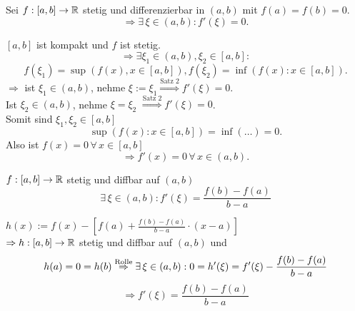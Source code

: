 \documentclass[../ana1.tex]{subfiles}
\begin{document}
\begin{satz}[Rolle]
    Sei \( f: [a,b] \rightarrow \mathbb{R} \) stetig und differenzierbar 
    in \( (a,b) \) mit \( f(a) = f(b) = 0 \).
    \[ \Rightarrow \exists \, \xi \in (a,b) : f'(\xi) = 0. \]
\end{satz}
\begin{bew}
    \( [a,b]\) ist kompakt und \(f\) ist stetig.
    \[ \Rightarrow \exists \xi_1 \in (a,b), \xi_2 \in [a,b]: \]
    \[ f(\xi_1) = \sup( f(x), x \in [a,b] ), f(\xi_2) 
    = \inf (f(x) : x \in [a,b]). \]
    \( \Rightarrow \) ist \( \xi_1 \in (a,b) \), nehme 
    \( \xi := \xi_1 \overset{\text{Satz 2}}{\Rightarrow}
     f'(\xi) = 0 \).\\
    Ist \( \xi_2 \in (a,b) \), nehme \( \xi = \xi_2 \)
    \( \overset{\text{Satz 2}}{\Rightarrow} f'(\xi) = 0 \).\\
    Somit sind \( \xi_1, \xi_2 \in [a,b] \)
    \[ \sup(f(x) : x\in [a,b]) = \inf(\ldots) = 0. \]
    Also ist \( f(x) = 0 \,\forall \, x\in [a,b] \)
    \[ \Rightarrow f'(x) = 0 \, \forall \, x\in (a,b). \]
\end{bew}
\begin{satz}[Mittelwertsatz]
    \( f: [a, b] \rightarrow \mathbb{R} \) stetig und diffbar auf \((a,b)\)
    \[ \exists \, \xi \in (a,b): f'(\xi) = \frac{f(b)-f(a)}{b-a} \]
\end{satz}
\begin{bew}
    \( h(x) :=  f(x) - \left[f(a) + \frac{f(b)-f(a)}{b-a} \cdot (x-a) \right] \) \\
    \( \Rightarrow h: [a,b] \rightarrow \mathbb{R} \) stetig und diffbar auf \( (a,b) \) und
    \[ h(a) = 0 = h(b) \overset{\text{Rolle}}{\Rightarrow} 
    \exists \, \xi \in (a,b): 0 = h'(\xi) = f'(\xi) - \frac{f(b)-f(a)}{b-a} \]
    \[ \Rightarrow f'(\xi) = \frac{f(b)-f(a)}{b-a} \]
\end{bew}
\end{document}
